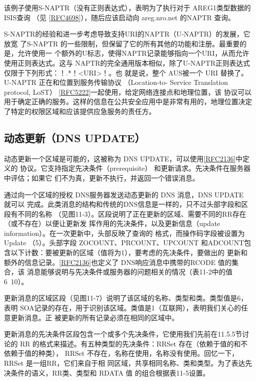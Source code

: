 该例子使用S-NAPTR（没有正则表达式），表明为了执行对于 AREG1类型数据的ISIS查询
（见 \href{https://www.rfc-editor.org/rfc/rfc4698}{[RFC4698]}），随后应该启动向
areg.nro.net 的NAPTR 查询。

S-NAPTR的经验和进一步考虑导致支持URI的NAPTR（U-NAPTR）的发展，它放宽
了S-NAPTR 的一些限制，但保留了它的所有其他的功能和注册。最重要的是，允许使用一
个额外的U标志，使得NAPTR记录能够指向一个URI，从而允许使用正则表达式。这与
NAPTR的完全通用版本相似，除了U-NAPTR正则表达式仅限于下列形式：！.*！<URI>！。也
就是说，整个 AUS被一个 URI 替换了。U-NAPTR 正在和位置到服务传输协议 （Location-to-
Service Translation protocol, LoST）
\href{https://www.rfc-editor.org/rfc/rfc5222}{[RFC5222]}一起使用，给定网络连接点和地理位置，该
协议可以用于确定正确的服务。这样的信息在公共安全应用中是非常有用的，地理位置决定
了特定的权限区域和应该提供应急服务的责任方。

\subsection{动态更新（DNS UPDATE）}

动态更新一个区域是可能的，这被称为 DNS
UPDATE，可以使用\href{https://www.rfc-editor.org/rfc/rfc2136}{[RFC2136]}中定义的
协议。它支持指定先决条件（prerequisite） 和更新请求。先决条件在服务器中评估；如果它
们不为真，更新不执行，并返回一个错误消息。

通过向一个区域的授权 DNS服务器发送动态更新的 DNS 消息，DNS UPDATE 就可以
完成。此类消息的结构和传统的DNS信息是一样的，只不过头部字段和区段有不同的名称
（见图11-3）。区段说明了正在更新的区域、需要不同的RR存在（或不存在）以便让更新发
挥作用的先决条件，以及更新信息（update information）。在一次更新中，头部反映了查询的
格式，而操作码字段被设置为Update （5）。头部字段 ZOCOUNT、PRCOUNT、UPCOUNT
和ADCOUNT包含以下计数：要被更新的区域（值将为1），要考虑的先决条件，要做出的
更新和额外的信息记录。\href{https://www.rfc-editor.org/rfc/rfc2136}{[RFC2136]}也定义了
DNS响应消息中携带的RCODE 值的集合，该
消息能够说明与先决条件或服务器的问题相关的情况（表11-2中的值6~10）。

更新消息的区域区段（见图11-7）说明了该区域的名称、类型和类。类型值是6，表明
SOA记录的存在，用于识别该区域。类值是1（互联网），表明我们关心的任意更新消息。正
被更新的所有记录必须在相同的区域中。

更新消息的先决条件区段包含一个或多个先决条件，它使用我们先前在11.5.5节讨论的
RR 的格式来描述。有五种类型的先决条件：RRSet 存在（依赖于值的和不依赖于值的种类），
RRSet 不存在，名称在使用，名称没有使用。回忆一下，RRSet 是一组RR，它们来自于相
同区域，共享相同名称、类和类型。为了表达先决条件的语义，RR类、类型和 RDATA 值
的组合根据表11-5设置。

